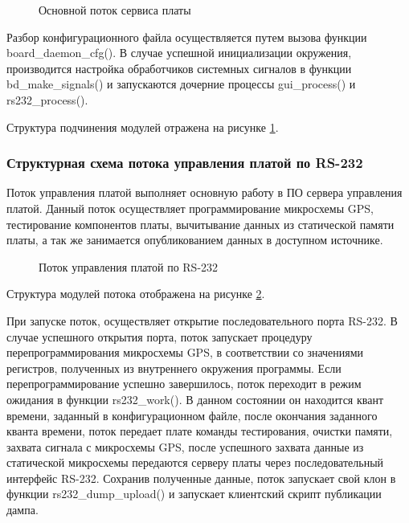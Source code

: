\begin{figure}[h]
\begin{center}
\end{center}
\caption{Основной поток сервиса платы}
\label{pic:board_daemon}
\end{figure}

Разбор конфигурационного файла осуществляется путем вызова функции board\_daemon\_cfg(). В случае успешной инициализации окружения,
производится настройка обработчиков системных сигналов в функции bd\_make\_signals() и запускаются дочерние процессы gui\_process()
и rs232\_process().

Структура подчинения модулей отражена на рисунке \ref{pic:board_daemon}.


\subsubsection*{Структурная схема потока управления платой по RS-232}
Поток управления платой выполняет основную работу в ПО сервера управления платой. Данный поток осуществляет программирование
микросхемы GPS, тестирование компонентов платы, вычитывание данных из статической памяти платы, а так же занимается опубликованием
данных в доступном источнике.

\begin{figure}[h]
\begin{center}
\end{center}
\caption{Поток управления платой по RS-232}
\label{pic:rs232_dumper}
\end{figure}

Структура модулей потока отображена на рисунке \ref{pic:rs232_dumper}.

При запуске поток, осуществляет открытие последовательного порта RS-232. В случае успешного открытия порта, поток запускает
процедуру перепрограммирования микросхемы GPS, в соответствии со значениями регистров, полученных из
внутреннего окружения программы. Если перепрограммирование успешно завершилось, поток переходит в режим ожидания в функции
rs232\_work(). В данном состоянии он находится квант времени, заданный в конфигурационном файле, после окончания заданного
кванта времени, поток передает плате команды тестирования, очистки памяти, захвата сигнала с микросхемы GPS, после успешного
захвата данные из статической микросхемы передаются серверу платы через последовательный интерфейс RS-232. Сохранив полученные
данные, поток запускает свой клон в функции rs232\_dump\_upload() и запускает клиентский скрипт публикации дампа.

